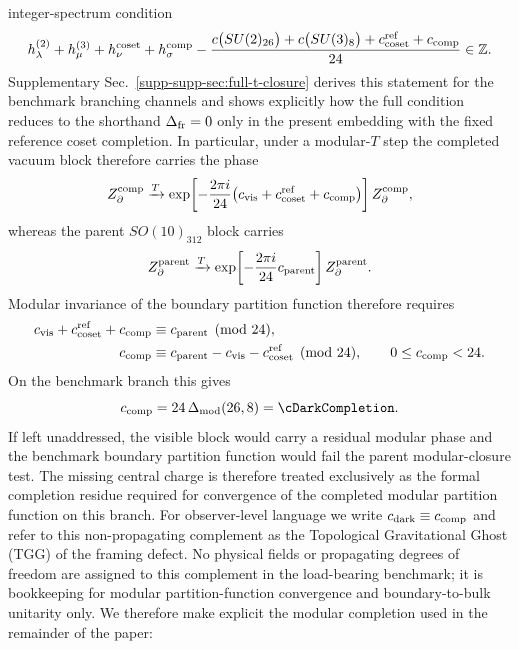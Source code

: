 \documentclass[11pt]{article}
\begin{document}
integer-spectrum condition
\begin{equation}
 h_{\lambda}^{(2)}+h_{\mu}^{(3)}+h_{\nu}^{\rm coset}+h_{\sigma}^{\rm comp}
 -
 \frac{c\bigl(SU(2)_{26}\bigr)+c\bigl(SU(3)_8\bigr)+c_{\rm coset}^{\rm ref}+c_{\rm comp}}{24}
 \in\mathbb Z.
 \label{eq:full-t-spectrum-condition}
\end{equation}
Supplementary Sec.~\ref{supp-supp-sec:full-t-closure} derives this statement for the
benchmark branching channels and shows explicitly how the full condition
reduces to the shorthand $\Delta_{\rm fr}=0$ only in the present embedding with the fixed reference coset completion. In
particular, under a modular-$T$ step the completed vacuum block therefore carries the phase
\begin{equation}
 Z_{\partial}^{\rm comp}
 \xrightarrow{T}
 \exp\!\left[-\frac{2\pi i}{24}\bigl(c_{\rm vis}+c_{\rm coset}^{\rm ref}+c_{\rm comp}\bigr)\right]Z_{\partial}^{\rm comp},
\end{equation}
whereas the parent $SO(10)_{312}$ block carries
\begin{equation}
 Z_{\partial}^{\rm parent}
 \xrightarrow{T}
 \exp\!\left[-\frac{2\pi i}{24}c_{\rm parent}\right]Z_{\partial}^{\rm parent}.
\end{equation}
Modular invariance of the boundary partition function therefore requires
\begin{equation}
 \begin{aligned}
  c_{\rm vis}+c_{\rm coset}^{\rm ref}+c_{\rm comp}
  &\equiv c_{\rm parent}\pmod{24},\\
  c_{\rm comp}
  &\equiv c_{\rm parent}-c_{\rm vis}-c_{\rm coset}^{\rm ref}\pmod{24},
  \qquad 0\le c_{\rm comp}<24.
 \end{aligned}
\end{equation}
On the benchmark branch this gives
\begin{equation}
 c_{\rm comp}=24\,\Delta_{\rm mod}(26,8)=\cDarkCompletion.
\end{equation}
If left unaddressed, the visible block would carry a residual modular phase and the benchmark boundary partition function would fail the parent modular-closure test. The missing central charge is therefore treated exclusively as the formal completion residue required for convergence of the completed modular partition function on this branch. For observer-level language we write $c_{\rm dark}\equiv c_{\rm comp}$ and refer to this non-propagating complement as the Topological Gravitational Ghost (TGG) of the framing defect. No physical fields or propagating degrees of freedom are assigned to this complement in the load-bearing benchmark; it is bookkeeping for modular partition-function convergence and boundary-to-bulk unitarity only. We therefore make explicit the modular completion used in the remainder of the paper:
\end{document}
